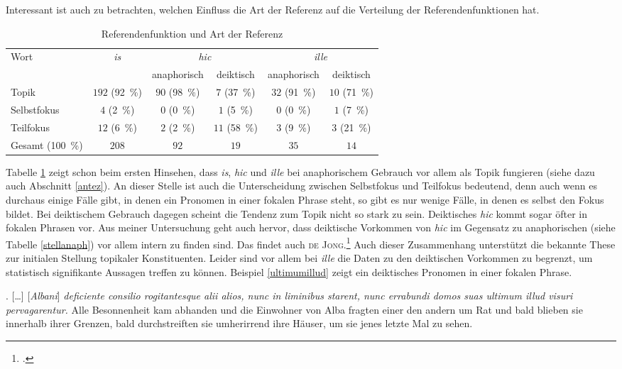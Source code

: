 \documentclass[12pt]{article}
\newcommand{\lat}[1]{\textit{#1}} %
\newcommand{\cntrl}[1]{#1} %
\begin{document}
Interessant ist auch zu betrachten, welchen Einfluss die Art der Referenz auf die Verteilung der Referendenfunktionen hat.

\begin{table}[h]
\centering
\begin{tabular}{l*{5}{c}}
\toprule
Wort & \lat{is}	& \multicolumn{2}{c}{\lat{hic}} & \multicolumn{2}{c}{\lat{ille}} \\
{} & {} & anaphorisch & deiktisch & anaphorisch & deiktisch  \\
\midrule
Topik & $192$ (\SI{92}{\%}) & $90$ (\SI{98}{\%}) & $7$ (\SI{37}{\%}) & $32$ (\SI{91}{\%}) & $10$ (\SI{71}{\%}) \\
Selbstfokus & $4$ (\SI{2}{\%}) & $0$ (\SI{0}{\%}) & $1$ (\SI{5}{\%}) & $0$ (\SI{0}{\%}) & $1$ (\SI{7}{\%}) \\
Teilfokus & $12$ (\SI{6}{\%}) & $2$ (\SI{2}{\%}) & $11$ (\SI{58}{\%}) & $3$ (\SI{9}{\%}) & $3$ (\SI{21}{\%}) \\
Gesamt (\SI{100}{\%}) & $208$ & $92$ & $19$ & $35$ & $14$ \\
\bottomrule
\end{tabular}
\caption{Referendenfunktion und Art der Referenz}
\label{refprag}
\end{table}

\noindent Tabelle \ref{refprag} zeigt schon beim ersten Hinsehen, dass \lat{is}, \lat{hic} und \lat{ille} bei anaphorischem Gebrauch vor allem als Topik fungieren (siehe dazu auch Abschnitt \ref{antez}). 
An dieser Stelle ist auch die Unterscheidung zwischen Selbstfokus und Teilfokus bedeutend, denn auch wenn es durchaus einige Fälle gibt, in denen ein Pronomen in  einer fokalen Phrase steht, so gibt es nur wenige Fälle, in denen es selbst den Fokus bildet.
Bei deiktischem Gebrauch dagegen scheint die Tendenz zum Topik nicht so stark zu sein. Deiktisches \lat{hic} kommt sogar öfter in fokalen Phrasen vor.
Aus meiner Untersuchung geht auch hervor, dass deiktische Vorkommen von \lat{hic} im Gegensatz zu anaphorischen (siehe Tabelle \ref{stellanaph}) vor allem intern zu finden sind.
Das findet auch \textsc{de Jong}.\footcite[S.\,525]{dejong89}
Auch dieser Zusammenhang unterstützt die bekannte These zur initialen Stellung topikaler Konstituenten.
Leider sind vor allem bei \lat{ille} die Daten zu den deiktischen Vorkommen zu begrenzt, um statistisch signifikante Aussagen treffen zu können.
Beispiel \ref{ultimumillud} zeigt ein deiktisches Pronomen in einer fokalen Phrase.

\ex.
\label{ultimumillud}
[\ldots] [\lat{Albani}] \lat{deficiente consilio rogitantesque alii alios, nunc in liminibus starent, nunc errabundi domos suas ultimum illud visuri pervagarentur.} 
\trans Alle \cntrl{Besonnenheit} kam abhanden und die Einwohner von Alba fragten einer den andern \cntrl{um Rat} und bald blieben sie innerhalb ihrer Grenzen, bald durchstreiften sie umherirrend ihre Häuser, um sie jenes letzte Mal zu sehen.
\end{document}
